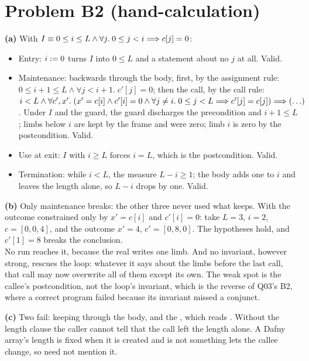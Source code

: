 \documentclass[11pt]{article}
\begin{document}
\section*{Problem B2 (hand-calculation)}\label{ans:B2}
\begin{answer}
\textbf{(a)} With $I \equiv 0 \leq i \leq L \wedge \forall j .\; 0 \leq j < i \Longrightarrow c[j] = 0$:
\begin{itemize}
\item Entry: $i \mathrel{:=} 0$ turns $I$ into $0 \leq L$ and a statement about no
  $j$ at all. Valid.
\item Maintenance: backwards through the body,  first, by the
  assignment rule: $0 \leq i + 1 \leq L \wedge \forall j < i + 1 .\; c'[j] =
  0$; then the call, by the call rule: $i < L \wedge \forall c', x' .\;
  (x' = c[i] \wedge c'[i] = 0 \wedge \forall j \neq i .\; 0 \leq j < L \Longrightarrow
  c'[j] = c[j]) \Longrightarrow (\ldots)$. Under $I$ and the guard, the guard discharges
  the precondition and $i + 1 \leq L$; limbs below $i$ are kept by the frame
  and were zero; limb $i$ is zero by the postcondition. Valid.
\item Use at exit: $I$ with $i \geq L$ forces $i = L$, which is the
  postcondition. Valid.
\item Termination: while $i < L$, the measure $L - i \geq 1$; the body adds
  one to $i$ and leaves the length alone, so $L - i$ drops by one. Valid.
\end{itemize}

\textbf{(b)} Only maintenance breaks: the other three never used what
 keeps. With the outcome constrained only by $x' = c[i]$ and
$c'[i] = 0$: take $L = 3$, $i = 2$, $c = [0, 0, 4]$, and the outcome $x' = 4$,
$c' = [0, 8, 0]$. The hypotheses hold, and $c'[1] = 8$ breaks the
conclusion. \\
No run reaches it, because the real  writes one limb. And no
invariant, however strong, rescues the loop: whatever it says about the limbs
before the last call, that call may now overwrite all of them except its own.
The weak spot is the callee's postcondition, not the loop's invariant, which
is the reverse of Q03's B2, where a correct program failed because its
invariant missed a conjunct.

\textbf{(c)} Two fail: keeping  through the body, and the
, which reads . Without the length clause the
caller cannot tell that the call left the length alone. A Dafny array's
length is fixed when it is created and is not something 
lets the callee change, so  need not mention it.
\end{answer}
\end{document}
